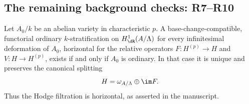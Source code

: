 \subsection{The remaining background checks: R7--R10}

\begin{proposition}[R7, scans 9:16--18]\label{prop:DE-R7}
Let $A_0/k$ be an abelian variety in characteristic $p$.  A base-change-compatible, functorial ordinary $k$-stratification on $H^1_{\dR}(A/\Lambda)$ for every infinitesimal deformation of $A_0$, horizontal for the relative operators
$F:H^{(p)}\to H$ and $V:H\to H^{(p)}$, exists if and only if $A_0$ is ordinary.  In that case it is unique and preserves the canonical splitting
\[
 H=\omega_{A/\Lambda}\oplus\im F.
\]
Thus the Hodge filtration is horizontal, as asserted in the manuscript.
\end{proposition}
